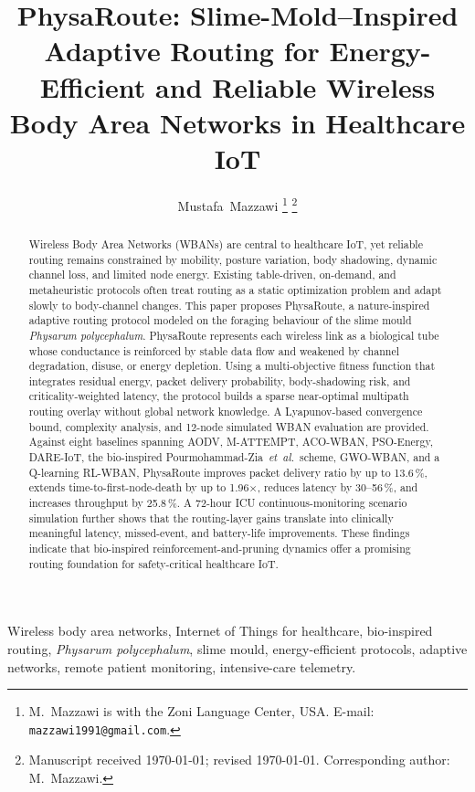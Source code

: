 \documentclass[journal,twoside,web]{IEEEtran}
\title{PhysaRoute: Slime-Mold--Inspired Adaptive Routing for
       Energy-Efficient and Reliable Wireless Body Area Networks
       in Healthcare IoT}
\author{Mustafa~Mazzawi%
\thanks{M.~Mazzawi is with the Zoni Language Center, USA.
        E-mail: \texttt{mazzawi1991@gmail.com}.}%
\thanks{Manuscript received \today; revised \today.
        Corresponding author: M.~Mazzawi.}}
\begin{document}
\maketitle

\begin{abstract}
Wireless Body Area Networks (WBANs) are central to healthcare IoT, yet
reliable routing remains constrained by mobility, posture variation, body
shadowing, dynamic channel loss, and limited node energy.  Existing
table-driven, on-demand, and metaheuristic protocols often treat routing
as a static optimization problem and adapt slowly to body-channel changes.
This paper proposes PhysaRoute, a nature-inspired adaptive routing
protocol modeled on the foraging behaviour of the slime mould
\textit{Physarum polycephalum}.  PhysaRoute represents each wireless link
as a biological tube whose conductance is reinforced by stable data flow
and weakened by channel degradation, disuse, or energy depletion.  Using
a multi-objective fitness function that integrates residual energy,
packet delivery probability, body-shadowing risk, and
criticality-weighted latency, the protocol builds a sparse near-optimal
multipath routing overlay without global network knowledge.  A
Lyapunov-based convergence bound, complexity analysis, and 12-node
simulated WBAN evaluation are provided.  Against eight baselines spanning
AODV, M-ATTEMPT, ACO-WBAN, PSO-Energy, DARE-IoT, the bio-inspired
Pourmohammad-Zia~\textit{et~al.}\ scheme, GWO-WBAN, and a Q-learning
RL-WBAN, PhysaRoute improves packet delivery ratio by up to 13.6\,\%,
extends time-to-first-node-death by up to 1.96$\times$, reduces latency
by 30--56\,\%, and increases throughput by 25.8\,\%.  A 72-hour ICU
continuous-monitoring scenario simulation further shows that the
routing-layer gains translate into clinically meaningful latency,
missed-event, and battery-life improvements.  These findings indicate
that bio-inspired reinforcement-and-pruning dynamics offer a promising
routing foundation for safety-critical healthcare IoT.
\end{abstract}

\begin{IEEEkeywords}
Wireless body area networks, Internet of Things for healthcare,
bio-inspired routing, \textit{Physarum polycephalum}, slime mould,
energy-efficient protocols, adaptive networks, remote patient monitoring,
intensive-care telemetry.
\end{IEEEkeywords}
\end{document}
